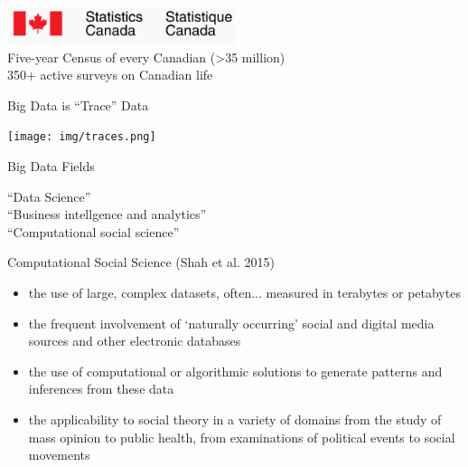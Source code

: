 \documentclass{beamer}
\begin{document}


\begin{frame}[plain]
  \begin{center}
      \includegraphics[width=0.5\textwidth]{img/stats-can.png} \\
      Five-year Census of every Canadian (>35 million) \\
      350+ active surveys on Canadian life
  \end{center}
\end{frame}

\begin{frame}{Big Data is ``Trace'' Data}
  \begin{center}
    \texttt{[image: img/traces.png]} 
  \end{center}
\end{frame}

\begin{frame}{Big Data Fields}
    \begin{center}
        ``Data Science'' \\
        ``Business intellgence and analytics'' \\
        ``Computational social science''
    \end{center}
\end{frame}

\begin{frame}{Computational Social Science (Shah et al. 2015)}
  \begin{itemize}[<+->]
    \item the use of large, complex datasets, often... measured in terabytes or petabytes
    \item the frequent involvement of `naturally occurring' social and digital media sources and other electronic databases
    \item the use of computational or algorithmic solutions to generate patterns and inferences from these data
    \item the applicability to social theory in a variety of domains from the study of mass opinion to public health, from examinations of political events to social movements
  \end{itemize}
\end{frame}
\end{document}
